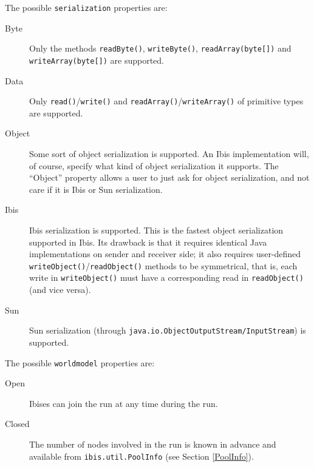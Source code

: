 \documentclass[10pt]{article}
\begin{document}
The possible \texttt{serialization} properties are:
\begin{description}
\item[Byte]
Only the methods \texttt{readByte()}, \texttt{writeByte()}, \texttt{readArray(byte[])} and \texttt{writeArray(byte[])} are supported.
\item[Data]
Only \texttt{read()}/\texttt{write()} and \texttt{readArray()}/\texttt{writeArray()} of primitive types are supported.
\item[Object]
Some sort of object serialization is supported. An Ibis implementation
will, of course, specify what kind of object serialization it supports.
The ``Object'' property allows a user to just ask for object
serialization, and not care if it is Ibis or Sun serialization.
\item[Ibis]
Ibis serialization is supported.
This is the fastest object serialization supported in Ibis. Its drawback
is that it requires identical Java implementations on sender and
receiver side; it also requires user-defined
\texttt{writeObject()}/\texttt{readObject()} methods to be symmetrical, that is,
each write in \texttt{writeObject()} must have a corresponding read
in \texttt{readObject()} (and vice versa).
\item[Sun]
Sun serialization (through \texttt{java.io.ObjectOutputStream/InputStream}) is
supported.
\end{description}

\noindent
The possible \texttt{worldmodel} properties are:
\begin{description}
\item[Open]
Ibises can join the run at any time during the run.
\item[Closed]
The number of nodes involved in the run is known in advance and
available from \texttt{ibis.util.PoolInfo} (see Section \ref{PoolInfo}).
\end{description}
\end{document}
